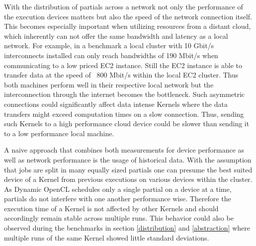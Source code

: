 With the distribution of partials across a network not only the performance of the execution devices matters but also the speed of the network connection itself. This becomes especially important when utilizing resources from a distant cloud, which inherently can not offer the same bandwidth and latency as a local network. For example, in a benchmark a local cluster with 10 Gbit/s interconnects installed can only reach bandwidths of 190 Mbit/s when communicating to a low priced EC2 instance. Still the EC2 instance is able to transfer data at the speed of ~800 Mbit/s within the local EC2 cluster. Thus both machines perform well in their respective local network but the interconnection through the internet becomes the bottleneck. Such asymmetric connections could significantly affect data intense Kernels where the data transfers might exceed computation times on a slow connection. Thus, sending such Kernels to a high performance cloud device could be slower than sending it to a low performance local machine.

A naive approach that combines both measurements for device performance as well as network performance is the usage of historical data. With the assumption that jobs are split in many equally sized partials one can presume the best suited device of a Kernel from previous executions on various devices within the cluster. As Dynamic OpenCL schedules only a single partial on a device at a time, partials do not interfere with one another performance wise. Therefore the execution time of a Kernel is not affected by other Kernels and should accordingly remain stable across multiple runs. This behavior could also be observed during the benchmarks in section \ref{distribution} and \ref{abstraction} where multiple runs of the same Kernel showed little standard deviations.

